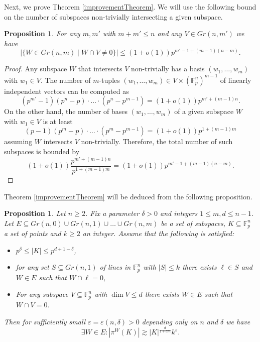 \documentclass{amsart}
\newtheorem{proposition}[theorem]{Proposition}
\newcommand{\F}{\mathbb F}
\begin{document}
Next, we prove Theorem \ref{improvementTheorem}. We will use the following bound on the number of subspaces non-trivially intersecting a given subspace.

\begin{proposition} \label{subspaceCounting}
    For any $m, m'$ with $m + m' \leq n$ and any $V \in Gr(n, m')$ we have $$ |\{W \in Gr(n, m) \mid W \cap V \neq 0\}| \leq (1 + o(1))p^{m' - 1 + (m - 1)(n - m)}.$$
\end{proposition}
\begin{proof}
    Any subspace $W$ that intersects $V$ non-trivially has a basis $(w_1, \ldots, w_m)$ with $w_1 \in V$. The number of  $m$-tuples $(w_1, \ldots, w_m) \in V \times (\F_p^n)^{m - 1}$ of linearly independent vectors can be computed as $$(p^{m'} - 1)(p^n - p) \cdot \ldots \cdot(p^n - p^{m - 1}) = (1 + o(1)) p^{m' + (m - 1)n}.$$
    On the other hand, the number of bases $(w_1, \ldots, w_m)$ of a given subspace $W$ with $w_1 \in V$ is at least 
    $$(p  - 1)(p^{m} - p) \cdot \ldots \cdot (p^{m} - p^{m - 1}) = (1 + o(1)) p^{1 + (m - 1)m}$$ 
    assuming $W$ intersects $V$ non-trivially. Therefore, the total number of such subspaces is bounded by
    $$(1 + o(1))\frac{p^{m' + (m - 1)n}}{p^{1 + (m - 1)m}} = (1 + o(1))p^{m' - 1 + (m -1)(n - m)}.$$
\end{proof}
Theorem \ref{improvementTheorem} will be deduced from the following proposition. 
\begin{proposition}\label{improvementProposition}
    Let $n \geq 2$. Fix a parameter $\delta > 0$ and integers $1 \leq m, d \leq n - 1$. Let $E \subseteq Gr(n, 0) \cup Gr(n, 1) \cup \ldots \cup Gr(n, m)$ be a set of subspaces, $K \subseteq \F_p^n$ a set of points and $k \geq 2$ an integer. Assume that the following is satisfied:
    \begin{itemize}
        \item $p^\delta \leq |K| \leq p^{d + 1 - \delta}$,
        \item for any set $S \subseteq Gr(n, 1)$ of lines in $\F_p^n$ with $|S| \leq k$ there exists $\ell \in S$ and $W \in E$ such that $W \cap \ell = 0$,
        \item For any subspace $V \subseteq \F_p^n$ with $\dim V \leq d$ there exists $W \in E$ such that $W \cap V = 0$.
    \end{itemize}
    Then for sufficiently small $\varepsilon = \varepsilon(n, \delta)> 0$ depending only on $n$ and $\delta$ we have 
    $$\exists W \in E: |\pi^W(K)| \gtrsim |K|^\frac{d}{1 + dm}k^\varepsilon.$$
\end{proposition}
\end{document}
